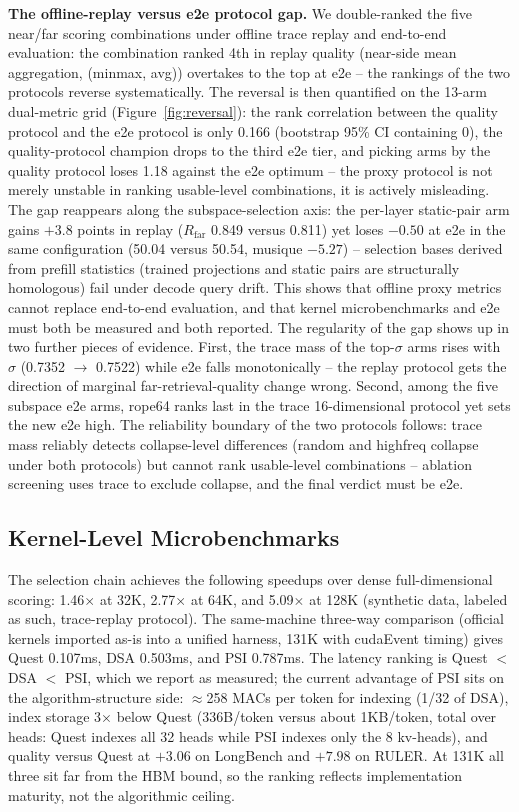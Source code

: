\documentclass[11pt]{article}
\begin{document}
\textbf{The offline-replay versus e2e protocol gap.} We double-ranked the five near/far scoring combinations under offline trace replay and end-to-end evaluation: the combination ranked 4th in replay quality (near-side mean aggregation, (minmax, avg)) overtakes to the top at e2e -- the rankings of the two protocols reverse systematically. The reversal is then quantified on the 13-arm dual-metric grid (Figure~\ref{fig:reversal}): the rank correlation between the quality protocol and the e2e protocol is only 0.166 (bootstrap 95\% CI containing 0), the quality-protocol champion drops to the third e2e tier, and picking arms by the quality protocol loses 1.18 against the e2e optimum -- the proxy protocol is not merely unstable in ranking usable-level combinations, it is actively misleading. The gap reappears along the subspace-selection axis: the per-layer static-pair arm gains $+3.8$ points in replay ($R_\mathrm{far}$ 0.849 versus 0.811) yet loses $-0.50$ at e2e in the same configuration (50.04 versus 50.54, musique $-5.27$) -- selection bases derived from prefill statistics (trained projections and static pairs are structurally homologous) fail under decode query drift. This shows that offline proxy metrics cannot replace end-to-end evaluation, and that kernel microbenchmarks and e2e must both be measured and both reported. The regularity of the gap shows up in two further pieces of evidence. First, the trace mass of the top-$\sigma$ arms rises with $\sigma$ (0.7352 $\rightarrow$ 0.7522) while e2e falls monotonically -- the replay protocol gets the direction of marginal far-retrieval-quality change wrong. Second, among the five subspace e2e arms, rope64 ranks last in the trace 16-dimensional protocol yet sets the new e2e high. The reliability boundary of the two protocols follows: trace mass reliably detects collapse-level differences (random and highfreq collapse under both protocols) but cannot rank usable-level combinations -- ablation screening uses trace to exclude collapse, and the final verdict must be e2e.

\subsection{Kernel-Level Microbenchmarks}

The selection chain achieves the following speedups over dense full-dimensional scoring: 1.46$\times$ at 32K, 2.77$\times$ at 64K, and 5.09$\times$ at 128K (synthetic data, labeled as such, trace-replay protocol). The same-machine three-way comparison (official kernels imported as-is into a unified harness, 131K with cudaEvent timing) gives Quest 0.107ms, DSA 0.503ms, and PSI 0.787ms. The latency ranking is Quest $<$ DSA $<$ PSI, which we report as measured; the current advantage of PSI sits on the algorithm-structure side: $\approx$258 MACs per token for indexing (1/32 of DSA), index storage 3$\times$ below Quest (336B/token versus about 1KB/token, total over heads: Quest indexes all 32 heads while PSI indexes only the 8 kv-heads), and quality versus Quest at $+3.06$ on LongBench and $+7.98$ on RULER. At 131K all three sit far from the HBM bound, so the ranking reflects implementation maturity, not the algorithmic ceiling.
\end{document}
